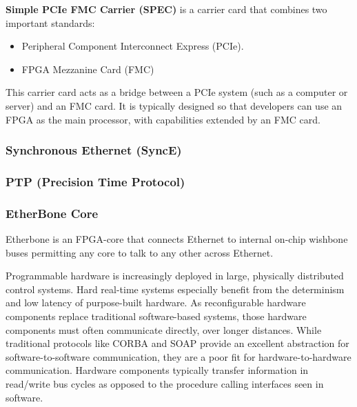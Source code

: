 \vspace{5 mm}

\noindent \textbf{Simple PCIe FMC Carrier (SPEC)} is a carrier card that combines two important standards:

\begin{itemize}
\item Peripheral Component Interconnect Express (PCIe).
\item FPGA Mezzanine Card (FMC)
\end{itemize}

\noindent This carrier card acts as a bridge between a PCIe system (such as a computer or server) and an FMC card. 
It is typically designed so that developers can use an FPGA as the main processor, with capabilities extended by an FMC card.

\subsubsection{Synchronous Ethernet (SyncE)}
\label{SyncE}

\subsubsection{PTP (Precision Time Protocol)}

\subsubsection{EtherBone Core}

Etherbone \cite{etherbone-core:ohwr} \cite{etherbone-core:spec} is an FPGA-core that connects Ethernet to internal on-chip wishbone buses permitting any core to talk to any other across Ethernet.

\vspace{5 mm}

\noindent Programmable hardware is increasingly deployed in large, physically distributed control systems. 
Hard real-time systems especially benefit from the determinism and low latency of purpose-built hardware. 
As reconfigurable hardware components replace traditional software-based systems, those hardware components must often communicate directly, over longer distances. 
While traditional protocols like CORBA and SOAP provide an excellent abstraction for software-to-software communication, they are a poor fit for hardware-to-hardware communication. 
Hardware components typically transfer information in read/write bus cycles as opposed to the procedure calling interfaces seen in software.

